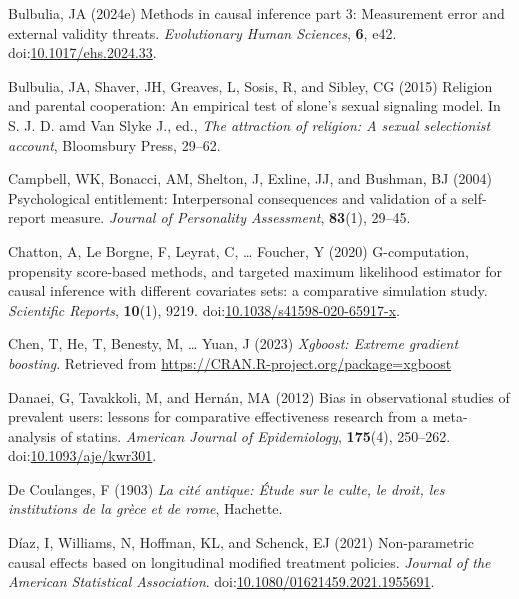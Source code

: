 \documentclass[
  single column]{article}
\newlength{\cslhangindent}
\newenvironment{CSLReferences}[2] %
 {\begin{list}{}{%
  \setlength{\itemindent}{0pt}
  \setlength{\leftmargin}{0pt}
  \setlength{\parsep}{0pt}
  \ifodd #1
   \setlength{\leftmargin}{\cslhangindent}
   \setlength{\itemindent}{-1\cslhangindent}
  \fi
  \setlength{\itemsep}{#2\baselineskip}}}
 {\end{list}}
\begin{document}
\begin{CSLReferences}{1}{0}
Bulbulia, JA (2024e) Methods in causal inference part 3: Measurement
error and external validity threats. \emph{Evolutionary Human Sciences},
\textbf{6}, e42.
doi:\href{https://doi.org/10.1017/ehs.2024.33}{10.1017/ehs.2024.33}.

Bulbulia, JA, Shaver, JH, Greaves, L, Sosis, R, and Sibley, CG (2015)
Religion and parental cooperation: An empirical test of slone's sexual
signaling model. In S. J. D. amd Van Slyke J., ed., \emph{The attraction
of religion: A sexual selectionist account}, Bloomsbury Press, 29--62.

Campbell, WK, Bonacci, AM, Shelton, J, Exline, JJ, and Bushman, BJ
(2004) Psychological entitlement: Interpersonal consequences and
validation of a self-report measure. \emph{Journal of Personality
Assessment}, \textbf{83}(1), 29--45.

Chatton, A, Le Borgne, F, Leyrat, C, \ldots{} Foucher, Y (2020)
G-computation, propensity score-based methods, and targeted maximum
likelihood estimator for causal inference with different covariates
sets: a comparative simulation study. \emph{Scientific Reports},
\textbf{10}(1), 9219.
doi:\href{https://doi.org/10.1038/s41598-020-65917-x}{10.1038/s41598-020-65917-x}.

Chen, T, He, T, Benesty, M, \ldots{} Yuan, J (2023) \emph{Xgboost:
Extreme gradient boosting}. Retrieved from
\url{https://CRAN.R-project.org/package=xgboost}

Danaei, G, Tavakkoli, M, and Hernán, MA (2012) Bias in observational
studies of prevalent users: lessons for comparative effectiveness
research from a meta-analysis of statins. \emph{American Journal of
Epidemiology}, \textbf{175}(4), 250--262.
doi:\href{https://doi.org/10.1093/aje/kwr301}{10.1093/aje/kwr301}.

De Coulanges, F (1903) \emph{La cité antique: Étude sur le culte, le
droit, les institutions de la grèce et de rome}, Hachette.

Díaz, I, Williams, N, Hoffman, KL, and Schenck, EJ (2021) Non-parametric
causal effects based on longitudinal modified treatment policies.
\emph{Journal of the American Statistical Association}.
doi:\href{https://doi.org/10.1080/01621459.2021.1955691}{10.1080/01621459.2021.1955691}.


\end{CSLReferences}
\end{document}
